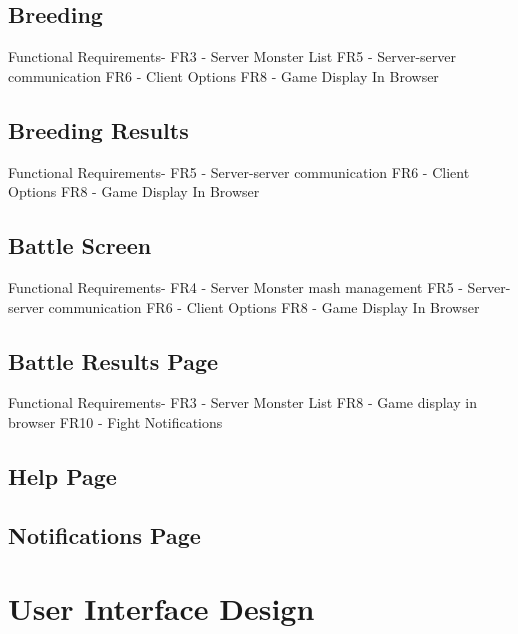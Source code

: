 \documentclass{project}
\begin{document}
\subsection{Breeding}
Functional Requirements-
FR3 - Server Monster List
FR5 - Server-server communication
FR6 - Client Options
FR8 - Game Display In Browser

\subsection{Breeding Results}
Functional Requirements-
FR5 - Server-server communication
FR6 - Client Options
FR8 - Game Display In Browser

\subsection{Battle Screen}
Functional Requirements-
FR4 - Server Monster mash management
FR5 - Server-server communication
FR6 - Client Options
FR8 - Game Display In Browser

\subsection{Battle Results Page}
Functional Requirements-
FR3 - Server Monster List
FR8 - Game display in browser
FR10 - Fight Notifications

\subsection{Help Page}

\subsection{Notifications Page}

\section{User Interface Design}
\end{document}
